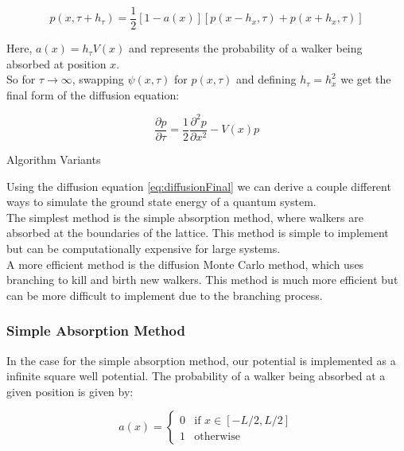 \documentclass[reqno]{amsart}
\makeatletter
\renewcommand\subsection{\@startsection{subsection}{2}%
  \z@{.5\linespacing\@plus.7\linespacing}{-.5em}%
  {\normalfont\scshape\justify}}
\numberwithin{equation}{section}
\numberwithin{figure}{section}
\makeatother
\begin{document}
\begin{equation}
p(x, \tau + h_\tau) = \frac{1}{2} \left[1 - a(x)\right] \left[p(x - h_x, \tau) + p(x + h_x, \tau)\right]
\end{equation}

Here, $a(x)=h_\tau V(x)$ and represents the probability of a walker being absorbed at position $x$. \\

So for $\tau \to \infty$, swapping $\psi(x,\tau)$ for $p(x,\tau)$ and defining $h_\tau = h_x^2$ we get the final form of the diffusion equation:

\begin{equation}
    \frac{\partial p}{\partial \tau} = \frac{1}{2}\frac{\partial^2 p}{\partial x^2} - V(x)p
    \label{eq:diffusionFinal}
\end{equation}

\subsection{Algorithm Variants}

Using the diffusion equation \ref{eq:diffusionFinal} we can derive a couple different ways to simulate the ground state energy of a quantum system. \\

The simplest method is the simple absorption method, where walkers are absorbed at the boundaries of the lattice. This method is simple to implement but can be computationally expensive for large systems. \\

A more efficient method is the diffusion Monte Carlo method, which uses branching to kill and birth new walkers. This method is much more efficient but can be more difficult to implement due to the branching process.

\subsubsection{Simple Absorption Method}

In the case for the simple absorption method, our potential is implemented as a infinite square well potential. The probability of a walker being absorbed at a given position is given by:

\begin{equation}
    a(x) = \begin{cases}
        0 & \text{if } x \in [-L/2, L/2] \\
        1 & \text{otherwise}
    \end{cases}
\end{equation}
\end{document}
